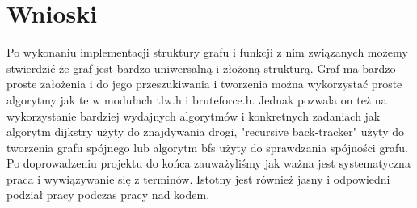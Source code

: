 \documentclass[]{article}
\begin{document}
\section{Wnioski}\label{header-n279}
Po wykonaniu implementacji struktury grafu i funkcji z nim związanych możemy stwierdzić że graf jest bardzo uniwersalną i złożoną strukturą. Graf ma bardzo proste założenia i do jego przeszukiwania i tworzenia można wykorzystać proste algorytmy jak te w modułach tlw.h i bruteforce.h. Jednak pozwala on też na wykorzystanie bardziej wydajnych algorytmów i konkretnych zadaniach jak algorytm dijkstry użyty do znajdywania drogi, "recursive back-tracker" użyty do tworzenia grafu spójnego lub algorytm bfs użyty do sprawdzania spójności grafu. Po doprowadzeniu projektu do końca zauważyliśmy jak ważna jest systematyczna praca i wywiązywanie się z terminów. Istotny jest również jasny i odpowiedni podział pracy podczas pracy nad kodem. 
\end{document}
